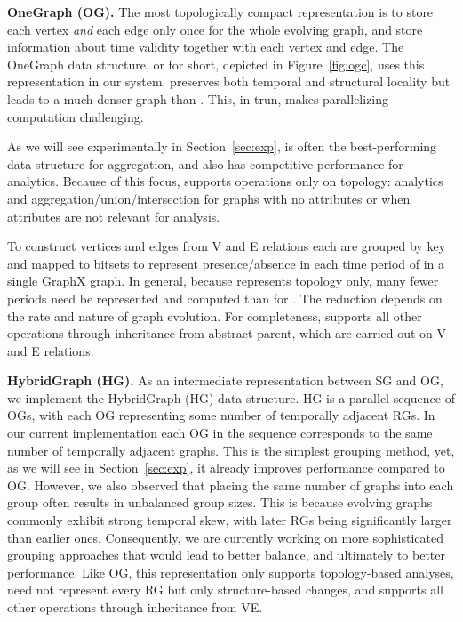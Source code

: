 {\bf OneGraph (OG).}  The most topologically compact representation is
to store each vertex {\em and} each edge only once for the whole
evolving graph, and store information about time validity together
with each vertex and edge.  The OneGraph data structure, or \og for
short, depicted in Figure~\ref{fig:ogc}, uses this representation in
our system.  \og preserves both temporal and structural locality but
leads to a much denser graph than \rg.  This, in trun, makes
parallelizing computation challenging.  

As we will see experimentally in Section~\ref{sec:exp}, \og is often
the best-performing data structure for aggregation, and also has
competitive performance for analytics.  Because of this focus, \og
supports operations only on topology: analytics and
aggregation/union/intersection for graphs with no attributes or when
attributes are not relevant for analysis.  

To construct \og vertices and edges from V and E relations each are
grouped by key and mapped to bitsets to represent presence/absence in
each time period of \tg in a single GraphX graph.  In general, because
\og represents topology only, many fewer periods need be represented
and computed than for \rg.  The reduction depends on the rate and
nature of graph evolution.  For completeness, \og supports all other
operations through inheritance from abstract parent, which are carried
out on V and E relations.

{\bf HybridGraph (HG).} As an intermediate representation between SG
and OG, we implement the HybridGraph (HG) data structure.  HG is a
parallel sequence of OGs, with each OG representing some number of
temporally adjacent RGs.  In our current implementation each OG in the
sequence corresponds to the same number of temporally adjacent graphs.
This is the simplest grouping method, yet, as we will see in
Section~\ref{sec:exp}, it already improves performance compared to OG.
However, we also observed that placing the same number of graphs into
each group often results in unbalanced group sizes.  This is because
evolving graphs commonly exhibit strong temporal skew, with later RGs
being significantly larger than earlier ones.  Consequently, we are
currently working on more sophisticated grouping approaches that would
lead to better balance, and ultimately to better performance.  Like
OG, this representation only supports topology-based analyses, need
not represent every RG but only structure-based changes, and supports
all other operations through inheritance from VE.

